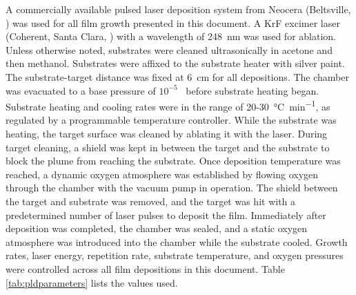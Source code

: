 A commercially available pulsed laser deposition system from Neocera (Beltsville,
) was used for all film growth presented in this document. A KrF excimer laser
(Coherent, Santa Clara, ) with a wavelength of \SI{248}{\nano\meter} was used for
ablation. Unless otherwise noted, substrates were cleaned ultrasonically in acetone and
then methanol. Substrates were affixed to the substrate heater with silver paint. The
substrate-target distance was fixed at \SI{6}{\centi\meter} for all depositions. The
chamber was evacuated to a base pressure of $10^{-5}$~\si{\torr} before substrate heating
began. Substrate heating and cooling rates were in the range of
20-30~\si{\degreeCelsius\per\minute}, as regulated by a programmable temperature
controller. While the substrate was heating, the target surface was cleaned by ablating it
with the laser. During target cleaning, a shield was kept in between the target and the
substrate to block the plume from reaching the substrate. Once deposition temperature was
reached, a dynamic oxygen atmosphere was established by flowing oxygen through the chamber
with the vacuum pump in operation. The shield between the target and substrate was
removed, and the target was hit with a predetermined number of laser pulses to deposit the
film. Immediately after deposition was completed, the chamber was sealed, and a static
oxygen atmosphere was introduced into the chamber while the substrate cooled. Growth
rates, laser energy, repetition rate, substrate temperature, and oxygen pressures were
controlled across all film depositions in this document. Table \ref{tab:pldparameters}
lists the values used. 
